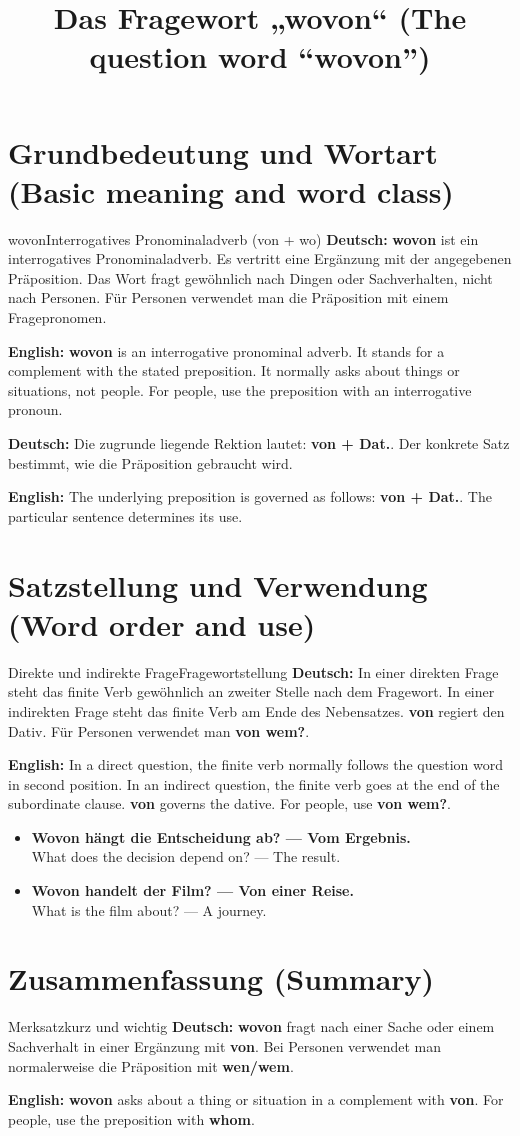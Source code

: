 \documentclass[a4paper,11pt]{article}
\title{Das Fragewort „wovon“ (The question word “wovon”)}
\date{}
\newcommand{\GermanText}[1]{\textbf{Deutsch: }#1\par}
\newcommand{\EnglishText}[1]{{\small\color{SoftGray}\textbf{English: }#1\par}}
\newcommand{\ExampleItem}[2]{\item \textbf{#1}\\{\small\color{SoftGray}#2}}
\begin{document}
\maketitle
\tableofcontents
\newpage
\section{Grundbedeutung und Wortart (Basic meaning and word class)}
\begin{grammarentry}{wovon}{Interrogatives Pronominaladverb (von + wo)}
\GermanText{\textbf{wovon} ist ein interrogatives Pronominaladverb. Es vertritt eine Ergänzung mit der angegebenen Präposition. Das Wort fragt gewöhnlich nach Dingen oder Sachverhalten, nicht nach Personen. Für Personen verwendet man die Präposition mit einem Fragepronomen.}
\EnglishText{\textbf{wovon} is an interrogative pronominal adverb. It stands for a complement with the stated preposition. It normally asks about things or situations, not people. For people, use the preposition with an interrogative pronoun.}
\GermanText{Die zugrunde liegende Rektion lautet: \textbf{von + Dat.}. Der konkrete Satz bestimmt, wie die Präposition gebraucht wird.}
\EnglishText{The underlying preposition is governed as follows: \textbf{von + Dat.}. The particular sentence determines its use.}
\end{grammarentry}
\section{Satzstellung und Verwendung (Word order and use)}
\begin{grammarentry}{Direkte und indirekte Frage}{Fragewortstellung}
\GermanText{In einer direkten Frage steht das finite Verb gewöhnlich an zweiter Stelle nach dem Fragewort. In einer indirekten Frage steht das finite Verb am Ende des Nebensatzes. \textbf{von} regiert den Dativ. Für Personen verwendet man \textbf{von wem?}.}
\EnglishText{In a direct question, the finite verb normally follows the question word in second position. In an indirect question, the finite verb goes at the end of the subordinate clause. \textbf{von} governs the dative. For people, use \textbf{von wem?}.}
\end{grammarentry}
\begin{exbox}\begin{itemize}
\ExampleItem{Wovon hängt die Entscheidung ab? — Vom Ergebnis.}{What does the decision depend on? — The result.}
\ExampleItem{Wovon handelt der Film? — Von einer Reise.}{What is the film about? — A journey.}
\end{itemize}\end{exbox}
\section{Zusammenfassung (Summary)}
\begin{grammarentry}{Merksatz}{kurz und wichtig}
\GermanText{\textbf{wovon} fragt nach einer Sache oder einem Sachverhalt in einer Ergänzung mit \textbf{von}. Bei Personen verwendet man normalerweise die Präposition mit \textbf{wen/wem}.}
\EnglishText{\textbf{wovon} asks about a thing or situation in a complement with \textbf{von}. For people, use the preposition with \textbf{whom}.}
\end{grammarentry}
\end{document}
